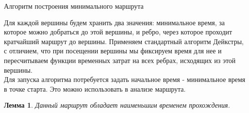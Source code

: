 \documentclass[12pt, a4paper]{article}
\newtheorem{lemma}{Лемма}[section]
\begin{document}



$\textbf{Алгоритм построения минимального маршрута}$

Для каждой вершины будем хранить два значения: минимальное время, за которое можно добраться до этой вершины, и ребро, через которое проходит кратчайший маршрут до вершины.
Применяем стандартный алгоритм Дейкстры, с отличием, что при посещении вершины мы фиксируем время для нее и пересчитываем функции временных затрат на всех ребрах, исходящих из этой вершины.\\
Для запуска алгоритма потребуется задать начальное время - минимальное время в точке старта. Это можно использовать в анализе маршрута.


\begin{lemma}
Данный маршрут обладает наименьшим временем прохождения.
\end{lemma}
\end{document}
